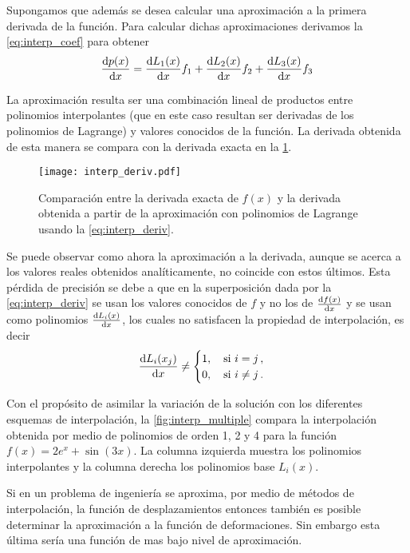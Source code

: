 Supongamos que además se desea calcular una aproximación a la primera derivada de la función. Para calcular dichas aproximaciones derivamos la \cref{eq:interp_coef} para obtener
\begin{equation}
  \dv{p(x)}{x} = \dv{L_1(x)}{x} f_1 + \dv{L_2(x)}{x} f_2 + \dv{L_3(x)}{x} 
  f_3
  \label{eq:interp_deriv}
\end{equation}

La aproximación resulta ser una combinación lineal de productos entre polinomios interpolantes (que en este caso resultan ser derivadas de los polinomios de Lagrange) y valores conocidos de la función. La derivada obtenida de esta manera se compara con la derivada exacta en la \cref{fig:interp_deriv}.

\begin{figure}[H]
  \centering
  \texttt{[image: interp\_deriv.pdf]}
  \caption{Comparación entre la derivada exacta de $f(x)$ y la derivada obtenida a partir de la aproximación con polinomios de Lagrange usando la \cref{eq:interp_deriv}.}
  \label{fig:interp_deriv}
\end{figure}

Se puede observar como ahora la aproximación a la derivada, aunque se acerca a 
los valores reales obtenidos analíticamente, no coincide con estos últimos. 
Esta pérdida de precisión se debe a que en la superposición dada por la 
\cref{eq:interp_deriv} se usan los valores conocidos de $f$ y no los de 
$\dv{f(x)}{x}$ y se usan como polinomios $\dv{L_i(x)}{x}$, los cuales no 
satisfacen la propiedad de interpolación, es decir
\[\dv{L_i(x_j)}{x} \neq \begin{cases}
1,\quad \text{si } i = j\, ,\\
0,\quad \text{si } i \neq j\, .
\end{cases}\]

Con el propósito de asimilar la variación de la solución con los diferentes 
esquemas de interpolación, la \cref{fig:interp_multiple} compara la  
interpolación obtenida por medio de polinomios de orden 1, 2 y 4 para la 
función $f(x) = 2e^{x} + \sin(3x)$. La columna izquierda muestra los polinomios 
interpolantes y la columna derecha los polinomios base $L_i (x)$.

\begin{tcolorbox}
Si en un problema de ingeniería se aproxima, por medio de métodos de interpolación, la función de desplazamientos entonces también es posible determinar la aproximación a la función de deformaciones. Sin embargo esta última sería una función de mas bajo nivel de aproximación.
\end{tcolorbox}

